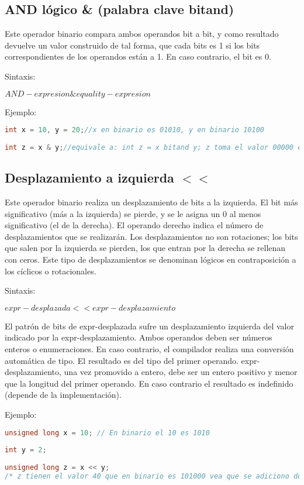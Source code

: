 \subsection{AND lógico \& (palabra clave bitand)}

Este operador binario compara ambos operandos bit a bit, y como resultado devuelve un valor construido de tal forma, que cada bits es 1 si los bits correspondientes de los operandos están a 1. En caso contrario, el bit es 0.

Sintaxis:

$ AND-expresion \& equality-expresion $ 

Ejemplo:

\lstset{language=C++, breaklines=true, basicstyle=\footnotesize}
\begin{lstlisting}[language=C++]
int x = 10, y = 20;//x en binario es 01010, y en binario 10100
	
int z = x & y;//equivale a: int z = x bitand y; z toma el valor 00000 es decir 0
\end{lstlisting}

\subsection{Desplazamiento a izquierda $ << $ }
Este operador binario realiza un desplazamiento de bits a la izquierda. El bit más significativo (más a la izquierda) se pierde, y se le asigna un 0 al menos significativo (el de la derecha). El operando derecho indica el número de desplazamientos que se realizarán. Los desplazamientos no son rotaciones; los bits que salen por la izquierda se pierden, los que entran por la derecha se rellenan con ceros. Este tipo de desplazamientos se denominan lógicos en contraposición a los cíclicos o rotacionales.

Sintaxis:

$ expr-desplazada << expr-desplazamiento $ 

El patrón de bits de expr-desplazada sufre un desplazamiento izquierda del valor indicado por la expr-desplazamiento. Ambos operandos deben ser números enteros o enumeraciones. En caso contrario, el compilador realiza una conversión automática de tipo. El resultado es del tipo del primer operando. expr-desplazamiento, una vez promovido a entero, debe ser un entero positivo y menor que la longitud del primer operando. En caso contrario el resultado es indefinido (depende de la implementación).

Ejemplo:

\lstset{language=C++, breaklines=true, basicstyle=\footnotesize}
\begin{lstlisting}[language=C++]
unsigned long x = 10; // En binario el 10 es 1010
	
int y = 2;
	
unsigned long z = x << y;  
/* z tienen el valor 40 que en binario es 101000 vea que se adiciono dos ceros al final que son los desplazamientos.*/
\end{lstlisting} 